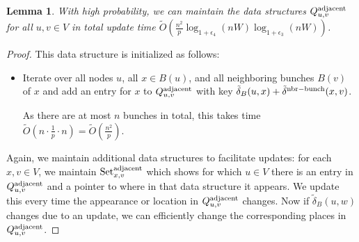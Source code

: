 \documentclass[11pt]{article}
\newtheorem{lemma}[theorem]{Lemma}
\theoremstyle{definition}
\theoremstyle{remark}
\begin{document}
\begin{titlepage}
\begin{lemma}\label{lm:adjacentDS}
    With high probability, we can maintain the data structures $Q^{\rm{adjacent}}_{u,v}$ for all $u,v\in V$ in total update time $ \tilde O (\tfrac{n^2}{p}\log_{1+\epsilon_4}(nW)\log_{1+\epsilon_3}(nW)) $.
\end{lemma}
\begin{proof}

    This data structure is initialized as follows:    
    \begin{itemize}
        \item Iterate over all nodes $ u $, all $ x \in B (u) $, and all neighboring bunches $ B (v) $ of $ x $ and add an entry for $x$ to $Q^{\rm{adjacent}}_{u,v}$ with key $\tilde\delta_B(u,x)+\tilde\delta^{\rm{nbr-bunch}}(x,v)$.
    
    As there are at most $ n $ bunches in total, this takes time $ \tilde O (n \cdot \tfrac{1}{p} \cdot n) = \tilde O (\tfrac{n^2}{ p}) $. 
    \end{itemize}
    Again, we maintain additional data structures to facilitate updates: for each $x,v\in V$, we maintain $\text{Set}_{x,v}^{\rm{adjacent}}$ which shows for which $u\in V$ there is an entry in $Q^{\rm{adjacent}}_{u,v}$ and a pointer to where in that data structure it appears. We update this every time the appearance or location in $Q^{\rm{adjacent}}_{u,v}$ changes. Now if $\tilde\delta_B(u,w)$ changes due to an update, we can efficiently change the corresponding places in $Q^{\rm{adjacent}}_{u,v}$. 
    

\end{proof}
\end{titlepage}
\end{document}

